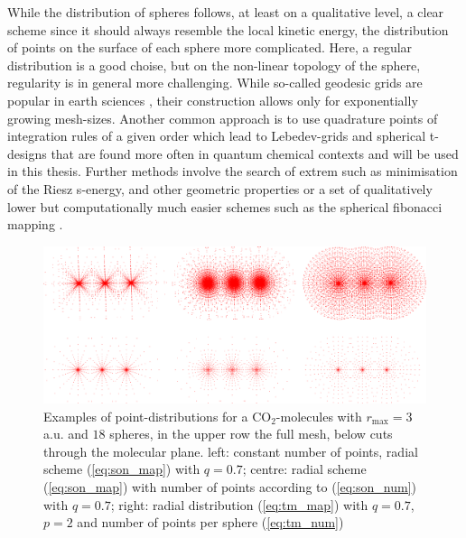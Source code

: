 While the distribution of spheres follows, at least on a qualitative level, a clear scheme since it should always resemble the local kinetic energy, the distribution of points on the surface of each sphere more complicated.
Here, a regular distribution is a good choise, but on the non-linear topology of the sphere, regularity is in general more challenging.
While so-called geodesic grids are popular in earth sciences \cite{geodesic1,geodesic2,geodes_charge}, their construction allows only for exponentially growing mesh-sizes.
Another common approach is to use quadrature points of integration rules of a given order which lead to Lebedev-grids \cite{lebedev,lebedev2} and spherical t-designs \cite{t-design1, t-design2} that are found more often in quantum chemical contexts \cite{LebQC1,LebQC2,lebDFT,lebDFT2} and will be used in this thesis.
Further methods involve the search of extrem such as minimisation of the Riesz s-energy, and other geometric properties \cite{fliegeMaier,womersley,wom2,wom3} or a set of qualitatively lower but computationally much easier schemes such as the spherical fibonacci mapping \cite{fibonacci,fibonacci2}.
\begin{figure}
   \includegraphics[width=\textwidth]{Figures/CO2_grid}
   \caption{Examples of point-distributions for a CO$_2$-molecules with $r_\text{max}=3\,$a.u. and $18$ spheres, in the upper row the full mesh, below cuts through the molecular plane.
   left: constant number of points, radial scheme (\ref{eq:son_map}) with $q=0.7$; centre: radial scheme (\ref{eq:son_map}) with number of points according to (\ref{eq:son_num}) with $q=0.7$; right: radial distribution (\ref{eq:tm_map}) with $q=0.7$, $p=2$ and number of points per sphere (\ref{eq:tm_num})}
   \label{fig:molmesh}
\end{figure}

